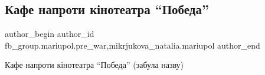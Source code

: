  
 
 
 
 

\subsection{Кафе напроти кінотеатра \enquote{Победа}}
\label{sec:04_02_2023.fb.fb_group.mariupol.pre_war.7.kafe_naproti_k_notea}
 
\ifcmt
 author_begin
   author_id fb_group.mariupol.pre_war,mikrjukova_natalia.mariupol
 author_end
\fi

Кафе напроти кінотеатра \enquote{Победа} (забула назву)

